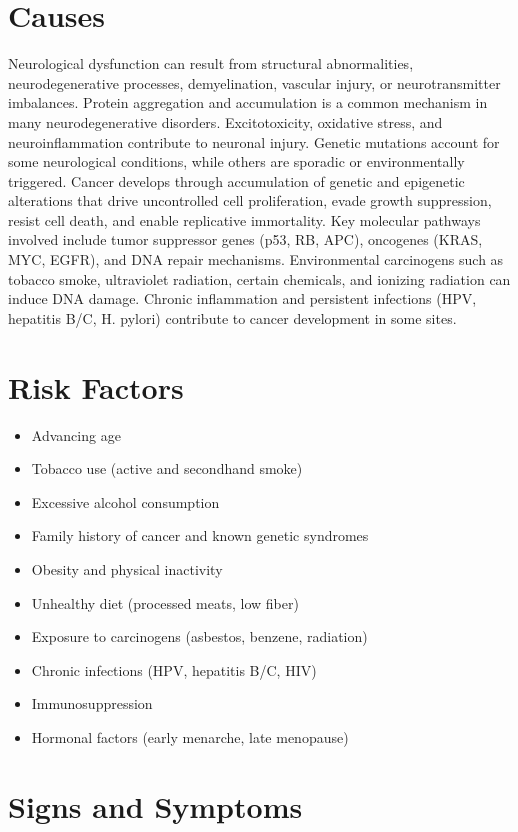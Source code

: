 \section{Causes}
Neurological dysfunction can result from structural abnormalities, neurodegenerative processes, demyelination, vascular injury, or neurotransmitter imbalances. Protein aggregation and accumulation is a common mechanism in many neurodegenerative disorders. Excitotoxicity, oxidative stress, and neuroinflammation contribute to neuronal injury. Genetic mutations account for some neurological conditions, while others are sporadic or environmentally triggered. Cancer develops through accumulation of genetic and epigenetic alterations that drive uncontrolled cell proliferation, evade growth suppression, resist cell death, and enable replicative immortality. Key molecular pathways involved include tumor suppressor genes (p53, RB, APC), oncogenes (KRAS, MYC, EGFR), and DNA repair mechanisms. Environmental carcinogens such as tobacco smoke, ultraviolet radiation, certain chemicals, and ionizing radiation can induce DNA damage. Chronic inflammation and persistent infections (HPV, hepatitis B/C, H. pylori) contribute to cancer development in some sites.
\section{Risk Factors}
\begin{itemize}[noitemsep]
  \item Advancing age
  \item Tobacco use (active and secondhand smoke)
  \item Excessive alcohol consumption
  \item Family history of cancer and known genetic syndromes
  \item Obesity and physical inactivity
  \item Unhealthy diet (processed meats, low fiber)
  \item Exposure to carcinogens (asbestos, benzene, radiation)
  \item Chronic infections (HPV, hepatitis B/C, HIV)
  \item Immunosuppression
  \item Hormonal factors (early menarche, late menopause)
\end{itemize}
\section{Signs and Symptoms}

